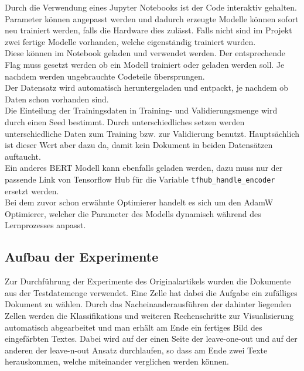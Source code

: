 \documentclass[DIV=13,fontsize=11pt]{scrartcl}
\begin{document}
Durch die Verwendung eines Jupyter Notebooks ist der Code interaktiv gehalten.
Parameter können angepasst werden und dadurch erzeugte Modelle können sofort
neu trainiert werden, falls die Hardware dies zulässt. Falls nicht
sind im Projekt zwei fertige Modelle vorhanden, welche eigenständig trainiert wurden.\\

Diese können im Notebook geladen und verwendet werden. Der entsprechende
Flag muss gesetzt werden ob ein Modell trainiert oder geladen werden soll.
Je nachdem werden ungebrauchte Codeteile übersprungen.\\

Der Datensatz wird automatisch heruntergeladen und entpackt, je nachdem ob
Daten schon vorhanden sind.\\

Die Einteilung der Trainingsdaten in Training- und Validierungsmenge wird durch
einen Seed bestimmt. Durch unterschiedliches setzen werden unterschiedliche
Daten zum Training bzw. zur Validierung benutzt. Hauptsächlich ist dieser
Wert aber dazu da, damit kein Dokument in beiden Datensätzen auftaucht.\\

Ein anderes BERT Modell kann ebenfalls geladen werden, dazu muss nur der passende
Link von Tensorflow Hub für die Variable \texttt{tfhub\_handle\_encoder} ersetzt
werden.\\

Bei dem zuvor schon erwähnte Optimierer handelt es sich um den AdamW~\cite{DBLP:journals/corr/abs-1711-05101}
Optimierer, welcher die Parameter des Modells dynamisch während des Lernprozesses
anpasst.\\

\subsection{Aufbau der Experimente}

Zur Durchführung der Experimente des Originalartikels wurden die Dokumente
aus der Testdatemenge verwendet. Eine Zelle hat dabei die Aufgabe ein zufälliges
Dokument zu wählen. Durch das Nacheinanderausführen der dahinter liegenden
Zellen werden die Klassifikations und weiteren Rechenschritte zur Visualisierung
automatisch abgearbeitet und man erhält am Ende ein fertiges Bild des
eingefärbten Textes. Dabei wird auf der einen Seite der leave-one-out und auf der
anderen der leave-n-out Ansatz durchlaufen, so dass am Ende zwei Texte herauskommen,
welche miteinander verglichen werden können.
\end{document}
